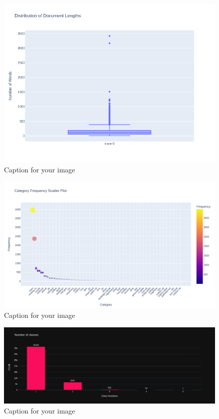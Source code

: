 \documentclass{article}
\begin{document}
\begin{figure}[h!]
  \centering
  \includegraphics[width=1\textwidth]{reuter3.png} 
  \caption{Caption for your image}
  \label{fig:your-label}
\end{figure}
\begin{figure}[h!]
  \centering
  \includegraphics[width=1\textwidth]{reuter4.png} 
  \caption{Caption for your image}
  \label{fig:your-label}
\end{figure}
\begin{figure}[h!]
  \centering
  \includegraphics[width=1\textwidth]{goemo1.png} 
  \caption{Caption for your image}
  \label{fig:your-label}
\end{figure}
\end{document}

